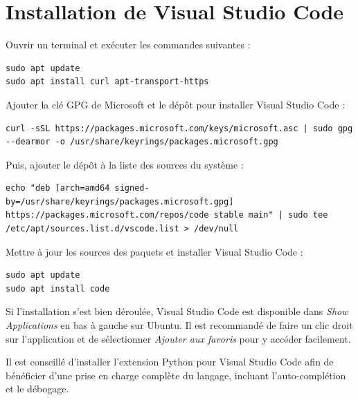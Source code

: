 \chapter{Installation de Visual Studio Code}
\label{annexe:vscode}
Ouvrir un terminal et exécuter les commandes suivantes :

\begin{lstlisting}[style=commandstyle]
sudo apt update
sudo apt install curl apt-transport-https
\end{lstlisting}

Ajouter la clé GPG de Microsoft et le dépôt pour installer Visual Studio Code :

\begin{lstlisting}[style=commandstyle]
curl -sSL https://packages.microsoft.com/keys/microsoft.asc | sudo gpg --dearmor -o /usr/share/keyrings/packages.microsoft.gpg
\end{lstlisting}

Puis, ajouter le dépôt à la liste des sources du système :

\begin{lstlisting}[style=commandstyle]
echo "deb [arch=amd64 signed-by=/usr/share/keyrings/packages.microsoft.gpg] https://packages.microsoft.com/repos/code stable main" | sudo tee /etc/apt/sources.list.d/vscode.list > /dev/null
\end{lstlisting}

Mettre à jour les sources des paquets et installer Visual Studio Code :

\begin{lstlisting}[style=commandstyle]
sudo apt update
sudo apt install code
\end{lstlisting}

Si l'installation s'est bien déroulée, Visual Studio Code est disponible dans \textit{Show Applications} en bas à gauche sur Ubuntu. Il est recommandé de faire un clic droit sur l'application et de sélectionner \textit{Ajouter aux favoris} pour y accéder facilement.

Il est conseillé d'installer l'extension Python pour Visual Studio Code afin de bénéficier d'une prise en charge complète du langage, incluant l'auto-complétion et le débogage.
